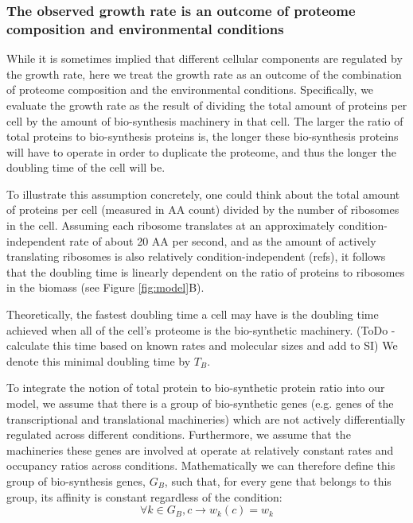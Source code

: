 \documentclass[notitlepage]{article}
\begin{document}
\subsubsection{The observed growth rate is an outcome of proteome composition and environmental conditions}
While it is sometimes implied that different cellular components are regulated by the growth rate, here we treat the growth rate as an outcome of the combination of proteome composition and the environmental conditions.
Specifically, we evaluate the growth rate as the result of dividing the total amount of proteins per cell by the amount of bio-synthesis machinery in that cell.
The larger the ratio of total proteins to bio-synthesis proteins is, the longer these bio-synthesis proteins will have to operate in order to duplicate the proteome, and thus the longer the doubling time of the cell will be.

To illustrate this assumption concretely, one could think about the total amount of proteins per cell (measured in AA count) divided by the number of ribosomes in the cell.
Assuming each ribosome translates at an approximately condition-independent rate of about 20 AA per second, and as the amount of actively translating ribosomes is also relatively condition-independent (refs), it follows that the doubling time is linearly dependent on the ratio of proteins to ribosomes in the biomass (see Figure \ref{fig:model}B).

Theoretically, the fastest doubling time a cell may have is the doubling time achieved when all of the cell's proteome is the bio-synthetic machinery.
(ToDo - calculate this time based on known rates and molecular sizes and add to SI)
We denote this minimal doubling time by $T_B$.

To integrate the notion of total protein to bio-synthetic protein ratio into our model, we assume that there is a group of bio-synthetic genes (e.g. genes of the transcriptional and translational machineries) which are not actively differentially regulated across different conditions.
Furthermore, we assume that the machineries these genes are involved at operate at relatively constant rates and occupancy ratios across conditions.
Mathematically we can therefore define this group of bio-synthesis genes, $G_B$, such that, for every gene that belongs to this group, its affinity is constant regardless of the condition:
\begin{equation}
  \label{eq:biosynth-def}
  \forall k \in G_B, c \rightarrow w_k(c)=w_k
\end{equation}
\end{document}
